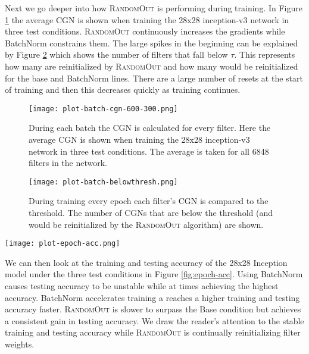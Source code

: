 \documentclass{article}
\begin{document}
	
Next we go deeper into how \textsc{RandomOut} is performing during training. In Figure \ref{fig:batch-cgn} the average CGN is shown when training the 28x28 inception-v3 network in three test conditions. \textsc{RandomOut} continuously increases the gradients while BatchNorm constrains them. The large spikes in the beginning can be explained by Figure \ref{fig:batch-belowthresh} which shows the number of filters that fall below $\tau$. This represents how many are reinitialized by \textsc{RandomOut} and how many would be reinitialized for the base and BatchNorm lines. There are a large number of resets at the start of training and then this decreases quickly as training continues.



	



\begin{figure}
\centering
\texttt{[image: plot-batch-cgn-600-300.png]}
    \caption{During each batch the CGN is calculated for every filter. Here the average CGN is shown when training the 28x28 inception-v3 network in three test conditions. The average is taken for all 6848 filters in the network.}
    \label{fig:batch-cgn}
\end{figure}



\begin{figure}
\texttt{[image: plot-batch-belowthresh.png]}
    \caption{During training every epoch each filter's CGN is compared to the threshold. The number of CGNs that are below the threshold (and would be reinitialized by the \textsc{RandomOut} algorithm) are shown.}
    \label{fig:batch-belowthresh}
\end{figure}


\begin{figure*}
\centering
    \texttt{[image: plot-epoch-acc.png]}
\caption{The training and testing accuracy of the 28x28 inception are shown here. The same initial seed is used for all networks so they all start with the same weights. Here it can be seen that the training error of \textsc{RandomOut} is more consistant than BatchNorm.}
\label{fig:epoch-acc}
\end{figure*}


We can then look at the training and testing accuracy of the 28x28 Inception model under the three test conditions in Figure \ref{fig:epoch-acc}. Using BatchNorm causes testing accuracy to be unstable while at times achieving the highest accuracy. BatchNorm accelerates training a reaches a higher training and testing accuracy faster. \textsc{RandomOut} is slower to surpass the Base condition but achieves a consistent gain in testing accuracy. We draw the reader's attention to the stable training and testing accuracy while \textsc{RandomOut} is continually reinitializing filter weights.
\end{document}
